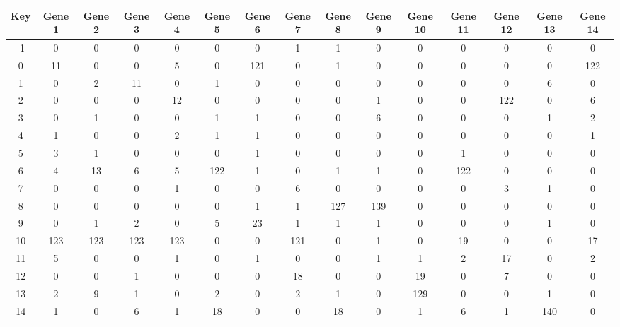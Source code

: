\begin{tabular}{|c|c|c|c|c|c|c|c|c|c|c|c|c|c|c|}
\hline
Key & Gene 1 & Gene 2 & Gene 3 & Gene 4 & Gene 5 & Gene 6 & Gene 7 & Gene 8 & Gene 9 & Gene 10 & Gene 11 & Gene 12 & Gene 13 & Gene 14 \\
\hline
-1 & 0 & 0 & 0 & 0 & 0 & 0 & 1 & 1 & 0 & 0 & 0 & 0 & 0 & 0 \\
0 & 11 & 0 & 0 & 5 & 0 & 121 & 0 & 1 & 0 & 0 & 0 & 0 & 0 & 122 \\
1 & 0 & 2 & 11 & 0 & 1 & 0 & 0 & 0 & 0 & 0 & 0 & 0 & 6 & 0 \\
2 & 0 & 0 & 0 & 12 & 0 & 0 & 0 & 0 & 1 & 0 & 0 & 122 & 0 & 6 \\
3 & 0 & 1 & 0 & 0 & 1 & 1 & 0 & 0 & 6 & 0 & 0 & 0 & 1 & 2 \\
4 & 1 & 0 & 0 & 2 & 1 & 1 & 0 & 0 & 0 & 0 & 0 & 0 & 0 & 1 \\
5 & 3 & 1 & 0 & 0 & 0 & 1 & 0 & 0 & 0 & 0 & 1 & 0 & 0 & 0 \\
6 & 4 & 13 & 6 & 5 & 122 & 1 & 0 & 1 & 1 & 0 & 122 & 0 & 0 & 0 \\
7 & 0 & 0 & 0 & 1 & 0 & 0 & 6 & 0 & 0 & 0 & 0 & 3 & 1 & 0 \\
8 & 0 & 0 & 0 & 0 & 0 & 1 & 1 & 127 & 139 & 0 & 0 & 0 & 0 & 0 \\
9 & 0 & 1 & 2 & 0 & 5 & 23 & 1 & 1 & 1 & 0 & 0 & 0 & 1 & 0 \\
10 & 123 & 123 & 123 & 123 & 0 & 0 & 121 & 0 & 1 & 0 & 19 & 0 & 0 & 17 \\
11 & 5 & 0 & 0 & 1 & 0 & 1 & 0 & 0 & 1 & 1 & 2 & 17 & 0 & 2 \\
12 & 0 & 0 & 1 & 0 & 0 & 0 & 18 & 0 & 0 & 19 & 0 & 7 & 0 & 0 \\
13 & 2 & 9 & 1 & 0 & 2 & 0 & 2 & 1 & 0 & 129 & 0 & 0 & 1 & 0 \\
14 & 1 & 0 & 6 & 1 & 18 & 0 & 0 & 18 & 0 & 1 & 6 & 1 & 140 & 0 \\
\hline
\end{tabular}